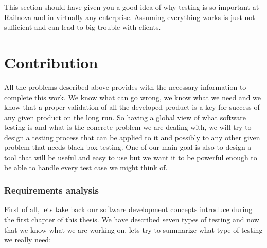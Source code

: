 \documentclass[12pt]{article}
\theoremstyle{definition}
\theoremstyle{definition}
\theoremstyle{remark}
\begin{document}

This section should have given you a good idea of why testing is so important at Railnova and in virtually any enterprise. Assuming everything works is just not sufficient and can lead to big trouble with clients.



\clearpage
\part{Contribution}

All the problems described above provides with the necessary information to complete this work. We know what can go wrong, we know what we need and we know that a proper validation of all the developed product is a key for success of any given product on the long run. So having a global view of what software testing is and what is the concrete problem we are dealing with, we will try to design a testing process that can be applied to it and possibly to any other given problem that needs black-box testing. One of our main goal is also to design a tool that will be useful and easy to use but we want it to be powerful enough to be able to handle every test case we might think of.\\


\clearpage



\section{Requirements analysis}


First of all, lets take back our software development concepts introduce during the first chapter of this thesis. We have described seven types of testing and now that we know what we are working on, lets try to summarize what type of testing we really need:\\
\end{document}
